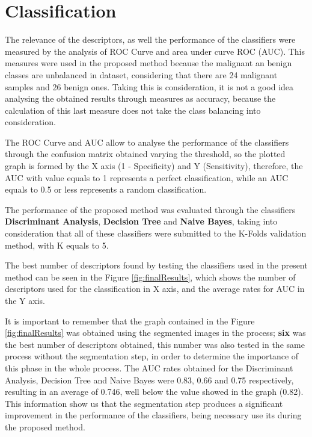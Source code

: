 \documentclass[conference]{IEEEtran}
\begin{document}
	\section{Classification}
		The relevance of the descriptors, as well the performance of the classifiers were measured by the analysis of ROC Curve and area under curve ROC (AUC). This measures were used in the proposed method because the malignant an benign classes are unbalanced in dataset, considering that there are 24 malignant samples and 26 benign ones. Taking this is consideration, it is not a good idea analysing the obtained results through measures as accuracy, because the calculation of this last measure does not take the class balancing into consideration.\par
		The ROC Curve and AUC allow to analyse the performance of the classifiers through the confusion matrix obtained varying the threshold, so the plotted graph is formed by the X axis (1 - Specificity) and Y (Sensitivity), therefore, the AUC with value equals to 1 represents a perfect classification, while an AUC equals to 0.5 or less represents a random classification.\par
		The performance of the proposed method was evaluated through the classifiers \textbf{Discriminant Analysis}, \textbf{Decision Tree} and \textbf{Naive Bayes}, taking into consideration that all of these classifiers were submitted to the K-Folds validation method, with K equals to 5.\par
		The best number of descriptors found by testing the classifiers used in the present method can be seen in the Figure \ref{fig:finalResults}, which shows the number of descriptors used for the classification in X axis, and the average rates for AUC in the Y axis.\par
		It is important to remember that the graph contained in the Figure \ref{fig:finalResults} was obtained using the segmented images in the process; \textbf{six} was the best number of descriptors obtained, this number was also tested in the same process without the segmentation step, in order to determine the importance of this phase in the whole process. The AUC rates obtained for the Discriminant Analysis, Decision Tree and Naive Bayes were 0.83, 0.66 and 0.75 respectively, resulting in an average of 0.746, well below the value showed in the graph (0.82). This information show us that the segmentation step produces a significant improvement in the performance of the classifiers, being necessary use its during the proposed method.
\end{document}
